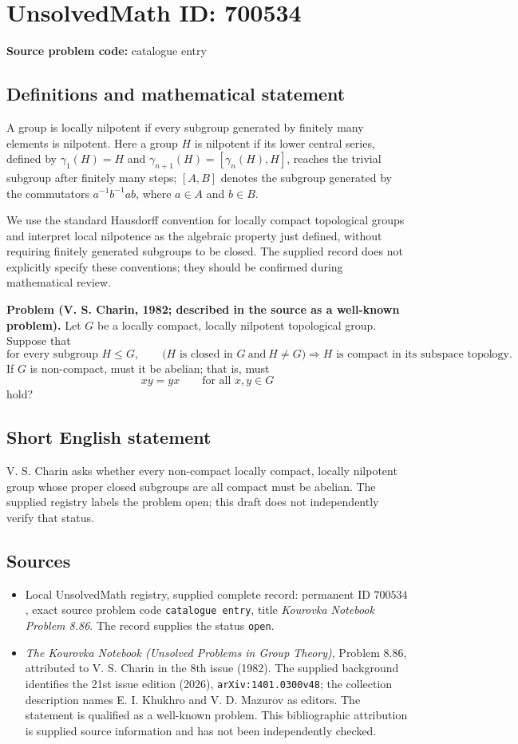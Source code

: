 \documentclass[11pt]{article}
\begin{document}
\section*{UnsolvedMath ID: 700534}
\textbf{Source problem code:} catalogue entry
\subsection{Definitions and mathematical statement}
A group is locally nilpotent if every subgroup generated by finitely many elements is nilpotent. Here a group \(H\) is nilpotent if its lower central series, defined by \(\gamma_1(H)=H\) and \(\gamma_{n+1}(H)=[\gamma_n(H),H]\), reaches the trivial subgroup after finitely many steps; \([A,B]\) denotes the subgroup generated by the commutators \(a^{-1}b^{-1}ab\), where \(a\in A\) and \(b\in B\).

We use the standard Hausdorff convention for locally compact topological groups and interpret local nilpotence as the algebraic property just defined, without requiring finitely generated subgroups to be closed. The supplied record does not explicitly specify these conventions; they should be confirmed during mathematical review.

\textbf{Problem (V. S. Charin, 1982; described in the source as a well-known problem).} Let \(G\) be a locally compact, locally nilpotent topological group. Suppose that
\[
\text{for every subgroup }H\leq G,\qquad
\bigl(H\text{ is closed in }G\ \text{and}\ H\ne G\bigr)
\Longrightarrow H\text{ is compact in its subspace topology}.
\]
If \(G\) is non-compact, must it be abelian; that is, must
\[
xy=yx\qquad\text{for all }x,y\in G
\]
hold?
\subsection{Short English statement}
V. S. Charin asks whether every non-compact locally compact, locally nilpotent group whose proper closed subgroups are all compact must be abelian. The supplied registry labels the problem open; this draft does not independently verify that status.
\subsection{Sources}
\begin{itemize}
\item Local UnsolvedMath registry, supplied complete record: permanent ID \(700534\), exact source problem code \texttt{catalogue entry}, title \emph{Kourovka Notebook Problem 8.86}. The record supplies the status \texttt{open}.
\item \emph{The Kourovka Notebook (Unsolved Problems in Group Theory)}, Problem 8.86, attributed to V. S. Charin in the 8th issue (1982). The supplied background identifies the 21st issue edition (2026), \texttt{arXiv:1401.0300v48}; the collection description names E. I. Khukhro and V. D. Mazurov as editors. The statement is qualified as a well-known problem. This bibliographic attribution is supplied source information and has not been independently checked.
\end{itemize}
\end{document}
